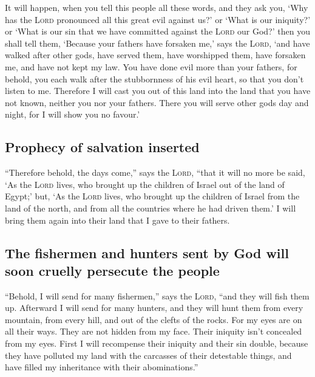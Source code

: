  It will happen, when you tell this people all these
words, and they ask you, `Why has the \textsc{Lord} pronounced all this
great evil against us?' or `What is our iniquity?' or `What is our sin
that we have committed against the \textsc{Lord} our God?'
 then you shall tell them, `Because your fathers have
forsaken me,' says the \textsc{Lord}, `and have walked after other gods,
have served them, have worshipped them, have forsaken me, and have not
kept my law.  You have done evil more than your fathers,
for behold, you each walk after the stubbornness of his evil heart, so
that you don't listen to me.  Therefore I will cast you
out of this land into the land that you have not known, neither you nor
your fathers. There you will serve other gods day and night, for I will
show you no favour.'

\hypertarget{prophecy-of-salvation-inserted}{%
\subsection{Prophecy of salvation
inserted}\label{prophecy-of-salvation-inserted}}

 ``Therefore behold, the days come,'' says the
\textsc{Lord}, ``that it will no more be said, `As the \textsc{Lord}
lives, who brought up the children of Israel out of the land of Egypt;'
 but, `As the \textsc{Lord} lives, who brought up the
children of Israel from the land of the north, and from all the
countries where he had driven them.' I will bring them again into their
land that I gave to their fathers.

\hypertarget{the-fishermen-and-hunters-sent-by-god-will-soon-cruelly-persecute-the-people}{%
\subsection{The fishermen and hunters sent by God will soon cruelly
persecute the
people}\label{the-fishermen-and-hunters-sent-by-god-will-soon-cruelly-persecute-the-people}}

 ``Behold, I will send for many fishermen,'' says the
\textsc{Lord}, ``and they will fish them up. Afterward I will send for
many hunters, and they will hunt them from every mountain, from every
hill, and out of the clefts of the rocks.  For my eyes
are on all their ways. They are not hidden from my face. Their iniquity
isn't concealed from my eyes.  First I will recompense
their iniquity and their sin double, because they have polluted my land
with the carcasses of their detestable things, and have filled my
inheritance with their abominations.''

